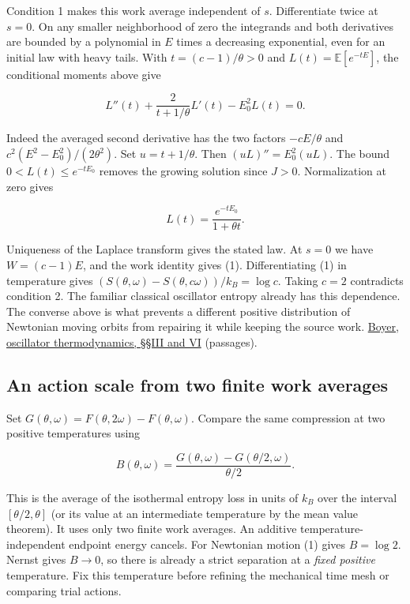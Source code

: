 \documentclass[11pt,a4paper]{article}
\begin{document}
Condition 1 makes this work average independent of \(s\). Differentiate
twice at \(s=0\). On any smaller neighborhood of zero the integrands and
both derivatives are bounded by a polynomial in \(E\) times a decreasing
exponential, even for an initial law with heavy tails. With
\(t=(c-1)/\theta>0\) and \(L(t)=\mathbb E[e^{-tE}]\), the conditional
moments above give

\[
 L''(t)+\frac{2}{t+1/\theta}L'(t)-E_0^2 L(t)=0.                 \tag{3}
\]

Indeed the averaged second derivative has the two factors \(-cE/\theta\)
and \(c^2(E^2-E_0^2)/(2\theta^2)\). Set \(u=t+1/\theta\). Then
\((uL)''=E_0^2(uL)\). The bound \(0<L(t)\le e^{-tE_0}\) removes the
growing solution since \(J>0\). Normalization at zero gives

\[
 L(t)=\frac{e^{-tE_0}}{1+\theta t}.
\]

Uniqueness of the Laplace transform gives the stated law. At \(s=0\) we
have \(W=(c-1)E\), and the work identity gives (1). Differentiating (1)
in temperature gives
\((S(\theta,\omega)-S(\theta,c\omega))/k_B=\log c\). Taking \(c=2\)
contradicts condition 2. The familiar classical oscillator entropy
already has this dependence. The converse above is what prevents a
different positive distribution of Newtonian moving orbits from
repairing it while keeping the source work.
\href{https://arxiv.org/pdf/physics/0210128}{Boyer, oscillator
thermodynamics, §§III and VI} (passages).

\subsection{An action scale from two finite work
averages}\label{an-action-scale-from-two-finite-work-averages}

Set \(G(\theta,\omega)=F(\theta,2\omega)-F(\theta,\omega)\). Compare the
same compression at two positive temperatures using

\[
 B(\theta,\omega)=
 \frac{G(\theta,\omega)-G(\theta/2,\omega)}{\theta/2}.
                                                                    \tag{4}
\]

This is the average of the isothermal entropy loss in units of \(k_B\)
over the interval \([\theta/2,\theta]\) (or its value at an intermediate
temperature by the mean value theorem). It uses only two finite work
averages. An additive temperature-independent endpoint energy cancels.
For Newtonian motion (1) gives \(B=\log 2\). Nernst gives \(B\to0\), so
there is already a strict separation at a \emph{fixed positive}
temperature. Fix this temperature before refining the mechanical time
mesh or comparing trial actions.
\end{document}
